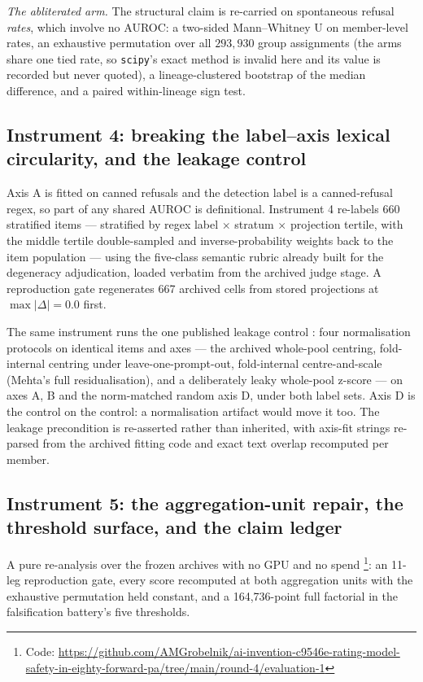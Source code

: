 \documentclass[11pt,letterpaper]{article}
\begin{document}
\emph{The abliterated arm.} The structural claim is re-carried on spontaneous refusal \emph{rates}, which involve no AUROC: a two-sided Mann--Whitney U on member-level rates, an exhaustive permutation over all $293{,}930$ group assignments (the arms share one tied rate, so \texttt{scipy}'s exact method is invalid here and its value is recorded but never quoted), a lineage-clustered bootstrap of the median difference, and a paired within-lineage sign test.

\subsection{Instrument 4: breaking the label--axis lexical circularity, and the leakage control}

Axis A is fitted on canned refusals and the detection label is a canned-refusal regex, so part of any shared AUROC is definitional. Instrument 4 re-labels 660 stratified items --- stratified by regex label $\times$ stratum $\times$ projection tertile, with the middle tertile double-sampled and inverse-probability weights back to the item population --- using the five-class semantic rubric already built for the degeneracy adjudication, loaded verbatim from the archived judge stage. A reproduction gate regenerates 667 archived cells from stored projections at $\max|\Delta| = 0.0$ first.

The same instrument runs the one published leakage control \citep{Mehta2026}: four normalisation protocols on identical items and axes --- the archived whole-pool centring, fold-internal centring under leave-one-prompt-out, fold-internal centre-and-scale (Mehta's full residualisation), and a deliberately leaky whole-pool z-score --- on axes A, B and the norm-matched random axis D, under both label sets. Axis D is the control on the control: a normalisation artifact would move it too. The leakage precondition is re-asserted rather than inherited, with axis-fit strings re-parsed from the archived fitting code and exact text overlap recomputed per member.

\subsection{Instrument 5: the aggregation-unit repair, the threshold surface, and the claim ledger}

A pure re-analysis over the frozen archives with no GPU and no spend \footnote{Code: \url{https://github.com/AMGrobelnik/ai-invention-c9546e-rating-model-safety-in-eighty-forward-pa/tree/main/round-4/evaluation-1}}: an 11-leg reproduction gate, every score recomputed at both aggregation units with the exhaustive permutation held constant, and a 164,736-point full factorial in the falsification battery's five thresholds.
\end{document}

